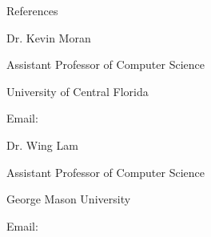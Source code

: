 \documentclass{resume} %
\begin{document}
\begin{rSection}{References}

\begin{rSubsection}{Dr. Kevin Moran}{}{}{}
\item Assistant Professor of Computer Science
\item University of Central Florida
\item Email: 
\end{rSubsection}

\begin{rSubsection}{Dr. Wing Lam}{}{}{}
\item Assistant Professor of Computer Science
\item George Mason University
\item Email: 
\end{rSubsection}

\end{rSection}
\end{document}
